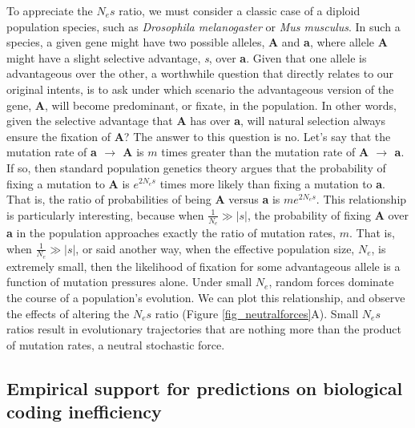\documentclass[twocolumn]{article}
\begin{document}
To appreciate the $N_es$ ratio, we must consider a classic case of a diploid population species, such as \textit{Drosophila melanogaster} or \textit{Mus musculus}. In such a species, a given gene might have two possible alleles, \textbf{A} and \textbf{a}, where allele \textbf{A} might have a slight selective advantage, \textit{s}, over \textbf{a}. Given that one allele is advantageous over the other, a worthwhile question that directly relates to our original intents, is to ask under which scenario the advantageous version of the gene, \textbf{A}, will become predominant, or fixate, in the population. In other words, given the selective advantage that \textbf{A} has over \textbf{a}, will natural selection always ensure the fixation of \textbf{A}? The answer to this question is no. Let's say that the mutation rate of \textbf{a $\rightarrow$ A} is $m$ times greater than the mutation rate of \textbf{A $\rightarrow$ a}. If so, then standard population genetics theory\cite{kimura1983neutral, Lynch_2007} argues that the probability of fixing a mutation to \textbf{A} is $e^{2N_es}$ times more likely than fixing a mutation to \textbf{a}. That is, the ratio of probabilities of being \textbf{A} versus \textbf{a} is $me^{2N_es}$. This relationship is particularly interesting, because when $\frac{1}{N_e} \gg |s|$, the probability of fixing \textbf{A} over \textbf{a} in the population approaches exactly the ratio of mutation rates, $m$. That is, when $\frac{1}{N_e} \gg |s|$, or said another way, when the effective population size, $N_e$, is extremely small, then the likelihood of fixation for some advantageous allele is a function of mutation pressures alone. Under small $N_e$, random forces dominate the course of a population's evolution. We can plot this relationship, and observe the effects of altering the $N_es$ ratio (Figure \ref{fig_neutralforces}A). Small $N_es$ ratios result in evolutionary trajectories that are nothing more than the product of mutation rates, a neutral stochastic force. 

\subsection{Empirical support for predictions on biological coding inefficiency} \label{Empirical support for predictions on biological coding inefficiency}
\end{document}
